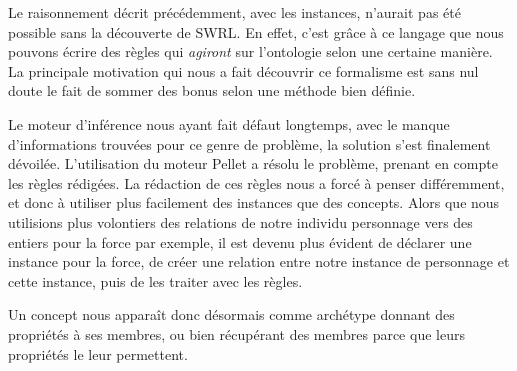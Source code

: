 \par Le raisonnement décrit précédemment, avec les instances, n'aurait pas été possible sans la découverte de SWRL. En effet, c'est grâce à ce langage que nous pouvons écrire des règles qui \emph{agiront} sur l'ontologie selon une certaine manière. La principale motivation qui nous a fait découvrir ce formalisme est sans nul doute le fait de sommer des bonus selon une méthode bien définie.
\par Le moteur d'inférence nous ayant fait défaut longtemps, avec le manque d'informations trouvées pour ce genre de problème, la solution s'est finalement dévoilée. L'utilisation du moteur Pellet a résolu le problème, prenant en compte les règles rédigées. La rédaction de ces règles nous a forcé à penser différemment, et donc à utiliser plus facilement des instances que des concepts. Alors que nous utilisions plus volontiers des relations de notre individu personnage vers des entiers pour la force par exemple, il est devenu plus évident de déclarer une instance pour la force, de créer une relation entre notre instance de personnage et cette instance, puis de les traiter avec les règles.
\par Un concept nous apparaît donc désormais comme archétype donnant des propriétés à ses membres, ou bien récupérant des membres parce que leurs propriétés le leur permettent.



